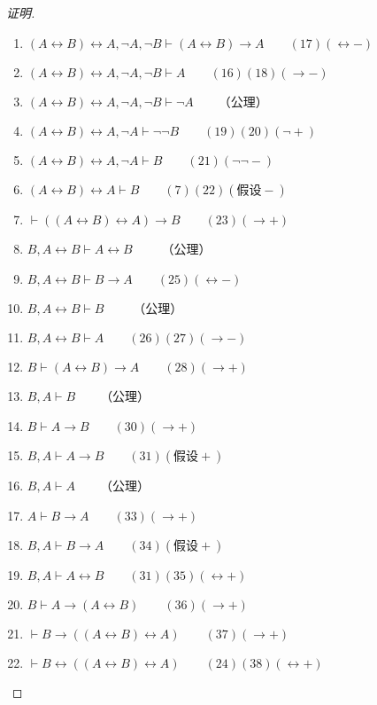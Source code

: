 \documentclass{article}
\begin{document}
\begin{CJK*}{UTF8}{gbsn}
\begin{proof}[证明]
\begin{enumerate}
        \item $(A\leftrightarrow B)\leftrightarrow A, \lnot A, \lnot B \vdash (A \leftrightarrow B)\to A\qquad (17)(\leftrightarrow -)$
        \item $(A\leftrightarrow B)\leftrightarrow A, \lnot A, \lnot B \vdash A\qquad (16)(18)(\to -)$
        \item $(A\leftrightarrow B)\leftrightarrow A, \lnot A, \lnot B \vdash \lnot A\qquad $（公理）
        \item $(A\leftrightarrow B)\leftrightarrow A, \lnot A\vdash \lnot \lnot B\qquad (19)(20)(\lnot +)$
        \item $(A\leftrightarrow B)\leftrightarrow A, \lnot A\vdash B\qquad (21)(\lnot \lnot -)$
        \item $(A\leftrightarrow B)\leftrightarrow A \vdash B\qquad (7)(22)(\text{假设} -)$
        \item $\vdash ((A\leftrightarrow B)\leftrightarrow A) \to B\qquad (23)(\to +)$
        \item $B, A\leftrightarrow B \vdash A\leftrightarrow B\qquad$ （公理）
        \item $B, A\leftrightarrow B \vdash B\to A \qquad (25)(\leftrightarrow -)$
        \item $B, A\leftrightarrow B \vdash B\qquad$ （公理）
        \item $B, A\leftrightarrow B \vdash A\qquad (26)(27)(\to -)$
        \item $B\vdash (A\leftrightarrow B) \to A\qquad (28)(\to +)$
        \item $B, A\vdash B\qquad$（公理）
        \item $B\vdash A\to B\qquad (30)(\to +)$
        \item $B,A\vdash A\to B\qquad (31)(\text{假设} +)$
        \item $B, A\vdash A\qquad$（公理）
        \item $A\vdash B\to A\qquad (33)(\to +)$
        \item $B,A\vdash B\to A\qquad (34)(\text{假设} +)$
        \item $B,A\vdash A\leftrightarrow B\qquad (31)(35)(\leftrightarrow +)$
        \item $B\vdash A\to (A\leftrightarrow B)\qquad (36)(\to +)$
        \item $\vdash B\to ((A\leftrightarrow B)\leftrightarrow A)\qquad (37)(\to +)$
        \item $\vdash B\leftrightarrow ((A\leftrightarrow B)\leftrightarrow A)\qquad (24)(38)(\leftrightarrow +)$
      \end{enumerate}

    \end{proof}
\end{CJK*}
\end{document}
